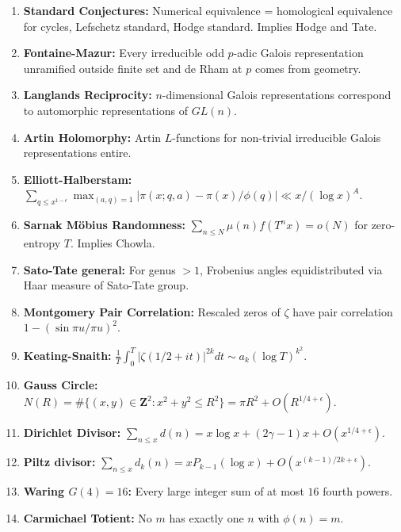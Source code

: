 \documentclass[aps,prd,amsmath,amssymb,twocolumn,superscriptaddress]{revtex4-2}
\begin{document}
\begin{enumerate}[label={\bf \arabic*.}, leftmargin=*, itemsep=2pt]
\item \textbf{Standard Conjectures:} Numerical equivalence = homological equivalence for cycles, Lefschetz standard, Hodge standard. Implies Hodge and Tate.

\item \textbf{Fontaine-Mazur:} Every irreducible odd $p$-adic Galois representation unramified outside finite set and de Rham at $p$ comes from geometry.

\item \textbf{Langlands Reciprocity:} $n$-dimensional Galois representations correspond to automorphic representations of $GL(n)$.

\item \textbf{Artin Holomorphy:} Artin $L$-functions for non-trivial irreducible Galois representations entire.

\item \textbf{Elliott-Halberstam:} $\sum_{q\le x^{1-\epsilon}}\max_{(a,q)=1}|\pi(x;q,a)-\pi(x)/\phi(q)|\ll x/(\log x)^A$.

\item \textbf{Sarnak M\"obius Randomness:} $\sum_{n\le N}\mu(n)f(T^n x)=o(N)$ for zero-entropy $T$. Implies Chowla.

\item \textbf{Sato-Tate general:} For genus $>1$, Frobenius angles equidistributed via Haar measure of Sato-Tate group.

\item \textbf{Montgomery Pair Correlation:} Rescaled zeros of $\zeta$ have pair correlation $1-(\sin\pi u/\pi u)^2$.

\item \textbf{Keating-Snaith:} $\frac1T\int_0^T|\zeta(1/2+it)|^{2k}dt\sim a_k(\log T)^{k^2}$.

\item \textbf{Gauss Circle:} $N(R)=\#\{(x,y)\in\mathbf Z^2:x^2+y^2\le R^2\}=\pi R^2+O(R^{1/4+\epsilon})$.

\item \textbf{Dirichlet Divisor:} $\sum_{n\le x}d(n)=x\log x+(2\gamma-1)x+O(x^{1/4+\epsilon})$.

\item \textbf{Piltz divisor:} $\sum_{n\le x}d_k(n)=xP_{k-1}(\log x)+O(x^{(k-1)/2k+\epsilon})$.

\item \textbf{Waring $G(4)=16$:} Every large integer sum of at most $16$ fourth powers.

\item \textbf{Carmichael Totient:} No $m$ has exactly one $n$ with $\phi(n)=m$.


\end{enumerate}
\end{document}
